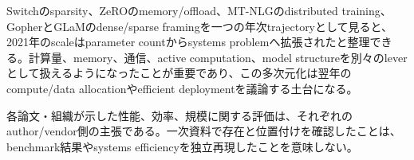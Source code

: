 Switchのsparsity、ZeROのmemory/offload、MT-NLGのdistributed training、GopherとGLaMのdense/sparse framingを一つの年次trajectoryとして見ると、2021年のscaleはparameter countからsystems problemへ拡張されたと整理できる。計算量、memory、通信、active computation、model structureを別々のleverとして扱えるようになったことが重要であり、この多次元化は翌年のcompute/data allocationやefficient deploymentを議論する土台になる。\autocite{src-0028da50cfe5,src-7652e568e428,src-7b8be93e524d,src-7fa5b597ba1f,src-b307b4b82867,src-d15ca2441916}


\begin{claimboundary}
各論文・組織が示した性能、効率、規模に関する評価は、それぞれのauthor/vendor側の主張である。一次資料で存在と位置付けを確認したことは、benchmark結果やsystems efficiencyを独立再現したことを意味しない。\autocite{src-0028da50cfe5,src-7652e568e428,src-7b8be93e524d,src-7fa5b597ba1f,src-b307b4b82867,src-d15ca2441916}
\end{claimboundary}
